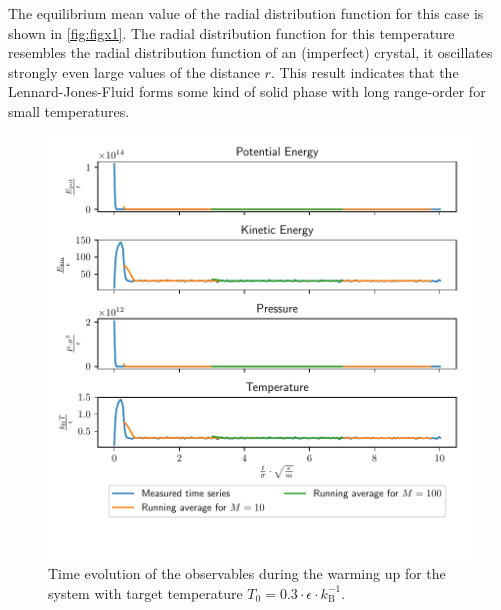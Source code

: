 \documentclass[a4paper,10pt,bibtotoc]{scrartcl}
\begin{document}
The equilibrium mean value of the radial distribution function for this case is shown in \autoref{fig:figx1}. 
The radial distribution function for this temperature resembles the radial distribution function of an (imperfect) crystal, it oscillates strongly even large values of the distance $r$. 
This result indicates that the Lennard-Jones-Fluid forms some kind of solid phase with long range-order for small temperatures.
\begin{figure}
        \centering
        \includegraphics[width=\linewidth]{warm03.pdf}
    \caption{Time evolution of the observables during the warming up for the system with target temperature $T_0 = 0.3\cdot \epsilon\cdot k_\mathrm{B}^{-1}$.}
    \label{fig:figx-1}
\end{figure}
\end{document}
